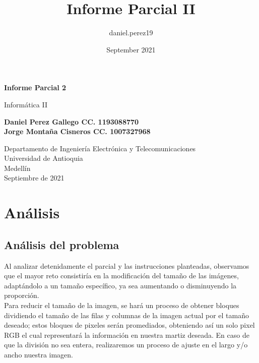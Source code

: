 \documentclass{article}
\title{Informe Parcial II}
\author{daniel.perez19 }
\date{September 2021}
\begin{document}
\begin{titlepage}
    \begin{center}
        \vspace*{1cm}
            
        \Huge
        \textbf{Informe Parcial 2}
            
        \vspace{0.5cm}
        \LARGE
        Informática II
            
        \vspace{1.5cm}
            
        \textbf{Daniel Perez Gallego CC. 1193088770\\Jorge Montaña Cisneros CC.  1007327968}
            
        \vfill
            
        \vspace{0.8cm}
            
        \Large
        Departamento de Ingeniería Electrónica y Telecomunicaciones\\
        Universidad de Antioquia\\
        Medellín\\
        Septiembre de 2021
            
    \end{center}
\end{titlepage}

\tableofcontents
\vspace{2cm}
\section{Análisis}
\subsection{Análisis del problema}
Al analizar detenidamente el parcial y las instrucciones planteadas, observamos que el mayor reto consistiría en la modificación del tamaño de las imágenes, adaptándolo a un tamaño específico, ya sea aumentando o disminuyendo la proporción.\\ 

Para reducir el tamaño de la imagen, se hará un proceso de obtener bloques dividiendo el tamaño de las filas y columnas de la imagen actual por el tamaño deseado; estos bloques de pixeles serán promediados, obteniendo así un solo pixel RGB el cual representará la información en nuestra martiz deseada. En caso de que la división no sea entera, realizaremos un proceso de ajuste en el largo y/o ancho nuestra imagen.\\
\end{document}
